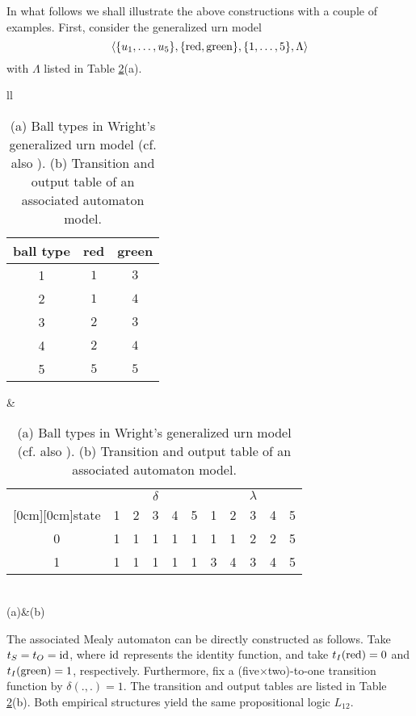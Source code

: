 In what follows we shall illustrate the above constructions with a couple of examples.
First, consider the generalized urn model
$$\langle \{u_1,\ldots ,u_5\},\{{\rm red,green}\},\{1,\ldots ,5\},\Lambda \rangle$$
with $\Lambda$ listed in Table \ref{t-wright}(a).
\begin{table}
\begin{center}
\begin{tabular}{ll}
\begin{tabular}{|c|cc|}
\hline\hline
ball type & red & green \\ \hline
1  & $1$ & $3$ \\
2  & $1$ & $4$ \\
3  & $2$ & $3$ \\
4  & $2$ & $4$ \\
5  & $5$ & $5$ \\
\hline\hline
\end{tabular}
\qquad
\qquad
&
\begin{tabular}{|c|ccccc|ccccc|}
 \hline\hline
 &&&$\delta$ && & &&$\lambda$&&\\
\raisebox{2.5ex}[0cm][0cm]{state} &1&2&3&4&5 & 1&2&3&4&5\\
 \hline
0&1&1&1&1&1 & 1&1&2&2&5\\
1&1&1&1&1&1 & 3&4&3&4&5\\
 \hline\hline
\end{tabular}
\\
(a)&(b)\\
\end{tabular}
\end{center}
\caption{\label{t-wright} (a) Ball types in Wright's generalized urn model
\protect\cite{wright} (cf. also \protect\cite[p.143ff]{svozil-ql}).
(b) Transition and output table of an associated automaton model.}
\end{table}

The associated Mealy automaton can be directly constructed as follows.
Take $t_S=t_O= {\rm id}$, where $ {\rm id}$ represents the identity function,
and take
$t_I({\rm red})=0$
and
$t_I({\rm green})=1$,
respectively.
Furthermore, fix a (five$\times$two)-to-one transition function by $\delta(.,.)=1$.
The transition and output tables are listed in Table  \ref{t-wright}(b).
Both empirical structures yield the same propositional logic $L_{12}$.


